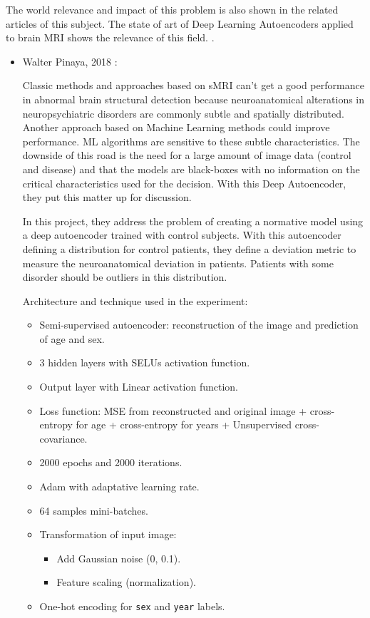 The world relevance and impact of this problem is also shown in the related articles of this subject. The state of art of Deep Learning Autoencoders applied to brain MRI shows the relevance of this field. .

\begin{itemize}
    \item Walter Pinaya, 2018 \cite{pinaya2019}:
    
    Classic methods and approaches based on sMRI can't get a good performance in abnormal brain structural detection because neuroanatomical alterations in neuropsychiatric disorders are commonly subtle and spatially distributed. Another approach based on Machine Learning methods could improve performance. ML algorithms are sensitive to these subtle characteristics. The downside of this road is the need for a large amount of image data (control and disease) and that the models are black-boxes with no information on the critical characteristics used for the decision. With this Deep Autoencoder, they put this matter up for discussion.
    
    In this project, they address the problem of creating a normative model using a deep autoencoder trained with control subjects. With this autoencoder defining a distribution for control patients, they define a deviation metric to measure the neuroanatomical deviation in patients. Patients with some disorder should be outliers in this distribution.
    
    Architecture and technique used in the experiment:
    \begin{itemize}
        \item Semi-supervised autoencoder: reconstruction of the image and prediction of age and sex.
        \item 3 hidden layers with SELUs activation function.
        \item Output layer with Linear activation function.
        \item Loss function: MSE from reconstructed and original image + cross-entropy for age + cross-entropy for years + Unsupervised cross-covariance.
        \item 2000 epochs and 2000 iterations.
        \item Adam with adaptative learning rate.
        \item 64 samples mini-batches.
        \item Transformation of input image:
        \begin{itemize}
            \item Add Gaussian noise (0, 0.1).
            \item Feature scaling (normalization).
        \end{itemize}
        \item One-hot encoding for \texttt{sex} and \texttt{year} labels.
    \end{itemize}
    

\end{itemize}
